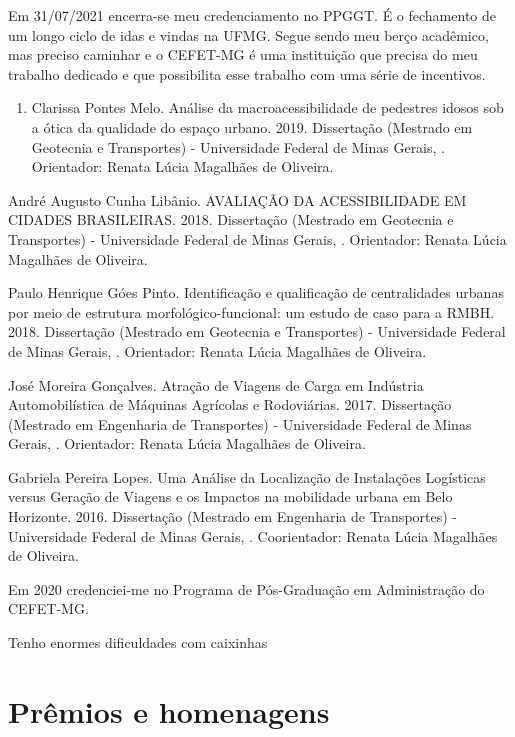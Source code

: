 \documentclass[
]{book}
\providecommand{\tightlist}{%
  \setlength{\itemsep}{0pt}\setlength{\parskip}{0pt}}
\begin{document}
Em 31/07/2021 encerra-se meu credenciamento no PPGGT. É o fechamento de um longo ciclo de idas e vindas na UFMG. Segue sendo meu berço acadêmico, mas preciso caminhar e o CEFET-MG é uma instituição que precisa do meu trabalho dedicado e que possibilita esse trabalho com uma série de incentivos.

\begin{enumerate}
\def\labelenumi{\arabic{enumi}.}
\tightlist
\item
  Clarissa Pontes Melo. Análise da macroacessibilidade de pedestres idosos sob a ótica da qualidade do espaço urbano. 2019. Dissertação (Mestrado em Geotecnia e Transportes) - Universidade Federal de Minas Gerais, . Orientador: Renata Lúcia Magalhães de Oliveira.
\end{enumerate}

André Augusto Cunha Libânio. AVALIAÇÃO DA ACESSIBILIDADE EM CIDADES BRASILEIRAS. 2018. Dissertação (Mestrado em Geotecnia e Transportes) - Universidade Federal de Minas Gerais, . Orientador: Renata Lúcia Magalhães de Oliveira.

Paulo Henrique Góes Pinto. Identificação e qualificação de centralidades urbanas por meio de estrutura morfológico-funcional: um estudo de caso para a RMBH. 2018. Dissertação (Mestrado em Geotecnia e Transportes) - Universidade Federal de Minas Gerais, . Orientador: Renata Lúcia Magalhães de Oliveira.

José Moreira Gonçalves. Atração de Viagens de Carga em Indústria Automobilística de Máquinas Agrícolas e Rodoviárias. 2017. Dissertação (Mestrado em Engenharia de Transportes) - Universidade Federal de Minas Gerais, . Orientador: Renata Lúcia Magalhães de Oliveira.

Gabriela Pereira Lopes. Uma Análise da Localização de Instalações Logísticas versus Geração de Viagens e os Impactos na mobilidade urbana em Belo Horizonte. 2016. Dissertação (Mestrado em Engenharia de Transportes) - Universidade Federal de Minas Gerais, . Coorientador: Renata Lúcia Magalhães de Oliveira.

Em 2020 credenciei-me no Programa de Pós-Graduação em Administração do CEFET-MG.

Tenho enormes dificuldades com caixinhas

\hypertarget{pruxeamios-e-homenagens}{%
\section{Prêmios e homenagens}\label{pruxeamios-e-homenagens}}
\end{document}
